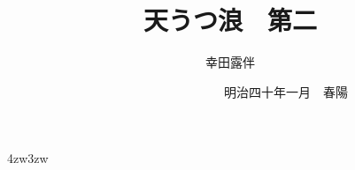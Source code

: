 \documentclass[dvipdfmx,uplatex,tate,book,paper=a5paper,jafontsize=13pt,
    open_bracket_pos=nibu_tentsuki,hanging_punctuation]{jlreq}
\title{\Huge 天うつ浪　{\Large 第二}}
\author{幸田露伴}
\date{　　　　　　　　　{\small 明治四十年一月}　春陽{\換字{堂}}}
\begin{document}
\maketitle
\pagestyle{myheadings}
\newcommand{\Entry}[1]{
	\section*{#1}
	\markboth{#1}{#1}
	\setcounter{equation}{0}}
\begin{indentation}{4zw}{3zw}
\parindent=0pt
\newpage
\　%
\newpage



















































\end{indentation}
\end{document}

